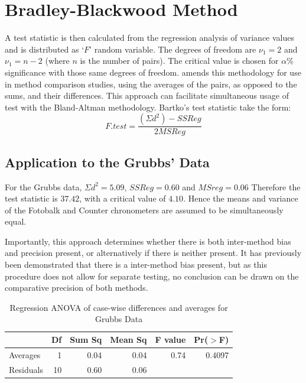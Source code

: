 \documentclass[12pt, a4paper]{report}
\theoremstyle{plain}
\theoremstyle{definition}
\theoremstyle{remark}
\begin{document}
	
	\section{Bradley-Blackwood Method}
	
	
	A test statistic is then calculated from the regression analysis
	of variance values \citep{BB89} and is distributed as `$F$' random
	variable. The degrees of freedom are $\nu_{1}=2$ and $\nu_{1}=n-2$
	(where $n$ is the number of pairs). The critical value is chosen
	for $\alpha\%$ significance with those same degrees of freedom.
	\citet{Bartko} amends this methodology for use in method
	comparison studies, using the averages of the pairs, as opposed to
	the sums, and their differences. This approach can facilitate
	simultaneous usage of test with the Bland-Altman methodology.
	Bartko's test statistic take the form:
	\[ F.test = \frac{(\Sigma d^{2})-SSReg}{2MSReg}
	\]

	
	\subsection{Application to the Grubbs' Data}
	For the Grubbs data, $\Sigma d^{2}=5.09 $, $SSReg = 0.60$ and
	$MSreg=0.06$ Therefore the test statistic is $37.42$, with a
	critical value of $4.10$. Hence the means and variance of the
	Fotobalk and Counter chronometers are assumed to be simultaneously
	equal.
	
	Importantly, this approach determines whether there is both
	inter-method bias and precision present, or alternatively if there
	is neither present. It has previously been demonstrated that there
	is a inter-method bias present, but as this procedure does not
	allow for separate testing, no conclusion can be drawn on the
	comparative precision of both methods.
	
	
	
	\begin{table}[ht]
		\begin{center}
			\begin{tabular}{lrrrrr}
				\hline
				& Df & Sum Sq & Mean Sq & F value & Pr($>$F) \\
				\hline
				Averages & 1 & 0.04 & 0.04 & 0.74 & 0.4097 \\
				Residuals & 10 & 0.60 & 0.06 &  &  \\
				\hline
			\end{tabular}
			\caption{Regression ANOVA of case-wise differences and averages
				for Grubbs Data}
		\end{center}
	\end{table}
	
\end{document}
